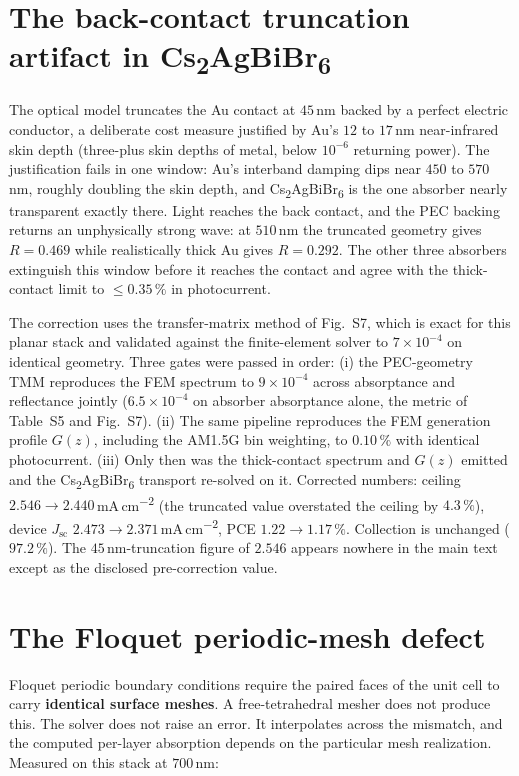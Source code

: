 \documentclass[lettersize,journal,onecolumn]{IEEEtran}
\newcommand{\CABB}{Cs\textsubscript{2}AgBiBr\textsubscript{6}}
\newcommand{\percm}{\,mA\,cm\textsuperscript{$-$2}}
\begin{document}
\section{The back-contact truncation artifact in \CABB}
The optical model truncates the Au contact at $45\,$nm backed by a perfect
electric conductor, a deliberate cost measure justified by Au's
$12$ to $17\,$nm near-infrared skin depth (three-plus skin depths of metal,
below $10^{-6}$ returning power). The justification fails in one window: Au's
interband damping dips near $450$ to $570\,$nm, roughly doubling the skin
depth, and \CABB{} is the one absorber nearly transparent exactly there.
Light reaches the back contact, and the PEC backing returns an unphysically
strong wave: at $510\,$nm the truncated geometry gives $R = 0.469$ while
realistically thick Au gives $R = 0.292$. The other three absorbers
extinguish this window before it reaches the contact and agree with the
thick-contact limit to $\leq0.35\,\%$ in photocurrent.

The correction uses the transfer-matrix method of Fig.~S7, which is exact for
this planar stack and validated against the finite-element solver to
$7\times10^{-4}$ on identical geometry. Three gates were passed in order:
(i) the PEC-geometry TMM reproduces the FEM spectrum to $9\times10^{-4}$
across absorptance and reflectance jointly ($6.5\times10^{-4}$ on absorber
absorptance alone, the metric of Table~S5 and Fig.~S7). (ii) The same pipeline reproduces the FEM generation
profile $G(z)$, including the AM1.5G bin weighting, to $0.10\,\%$ with
identical photocurrent. (iii) Only then was the thick-contact spectrum and
$G(z)$ emitted and the \CABB{} transport re-solved on it. Corrected numbers:
ceiling $2.546\rightarrow2.440$\percm{} (the truncated value overstated
the ceiling by $4.3\,\%$), device
$J_\mathrm{sc}$ $2.473\rightarrow2.371$\percm, PCE
$1.22\rightarrow1.17\,\%$. Collection is unchanged ($97.2\,\%$). The
$45\,$nm-truncation figure of $2.546$ appears nowhere in the main text
except as the disclosed pre-correction value.

\section{The Floquet periodic-mesh defect}
Floquet periodic boundary conditions require the paired faces of the unit cell
to carry \textbf{identical surface meshes}. A free-tetrahedral mesher does not
produce this. The solver does not raise an error. It interpolates across the
mismatch, and the computed per-layer absorption depends on the particular mesh
realization. Measured on this stack at $700\,$nm:
\end{document}

